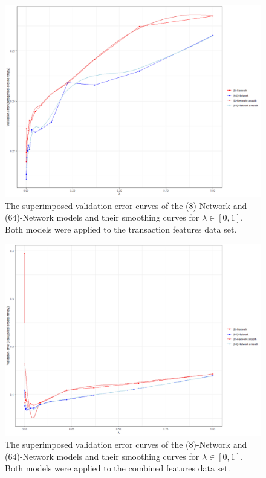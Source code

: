 \begin{figure}[]
	\begin{center}
		\includegraphics[scale = 0.5]{fig/CH3/model_comp_trans_HL_2.png}
		\caption{The superimposed validation error curves of the (8)-Network and (64)-Network models and their smoothing curves for $\lambda \in [0,1]$. Both models were applied to the transaction features data set.}
		\label{fig:ch3_nn_validation_compare_trans}
	\end{center}	
\end{figure}

\begin{figure}[]
	\begin{center}
		\includegraphics[scale = 0.5]{fig/CH3/model_comp_all_HL.png}
		\caption{The superimposed validation error curves of the (8)-Network and (64)-Network models and their smoothing curves for $\lambda \in [0,1]$. Both models were applied to the combined features data set.}
		\label{fig:ch3_nn_validation_compare_combined}
	\end{center}	
\end{figure}